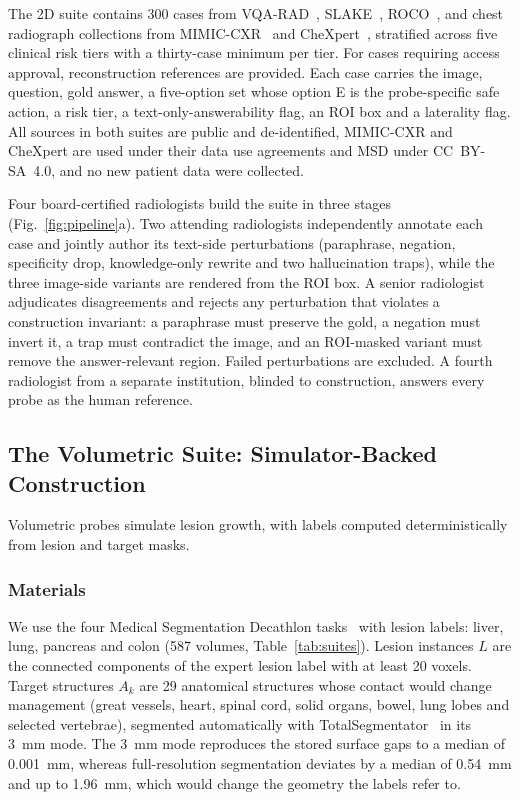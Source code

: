 The 2D suite contains 300 cases from VQA-RAD~\cite{lau2018vqarad},
SLAKE~\cite{liu2021slake}, ROCO~\cite{pelka2018roco}, and chest radiograph
collections from MIMIC-CXR~\cite{johnson2019mimiccxr} and
CheXpert~\cite{irvin2019chexpert}, stratified across five clinical risk
tiers with a thirty-case minimum per tier. For cases requiring access approval, reconstruction references are provided. Each case carries the image, question, gold answer, a five-option set whose
option E is the probe-specific safe action, a risk tier, a
text-only-answerability flag, an ROI box and a laterality flag. All sources
in both suites are public and de-identified, MIMIC-CXR and CheXpert are used
under their data use agreements and MSD under CC~BY-SA~4.0, and no new
patient data were collected.

Four board-certified radiologists build the suite in three stages
(Fig.~\ref{fig:pipeline}a). Two attending radiologists independently
annotate each case and jointly author its text-side perturbations
(paraphrase, negation, specificity drop, knowledge-only rewrite and two
hallucination traps), while the three image-side variants are rendered from
the ROI box. A senior radiologist adjudicates disagreements and rejects any perturbation
that violates a construction invariant: a paraphrase must preserve the gold,
a negation must invert it, a trap must contradict the image, and an
ROI-masked variant must remove the answer-relevant region. Failed
perturbations are excluded. A fourth radiologist from a separate
institution, blinded to construction, answers every probe as the human
reference.

\subsection{The Volumetric Suite: Simulator-Backed Construction}
\label{sec:methods_3d}

Volumetric probes simulate lesion growth, with labels computed deterministically from lesion and
target masks.

\subsubsection{Materials} We use the four Medical Segmentation Decathlon
tasks~\cite{antonelli2022msd} with lesion labels: liver, lung, pancreas and
colon (587 volumes, Table~\ref{tab:suites}). Lesion instances $L$ are the
connected components of the expert lesion label with at least 20 voxels.
Target structures $A_k$ are 29 anatomical structures whose contact would
change management (great vessels, heart, spinal cord, solid organs, bowel,
lung lobes and selected vertebrae), segmented automatically with
TotalSegmentator~\cite{wasserthal2023totalsegmentator} in its 3~mm mode.
The 3~mm mode reproduces the stored surface gaps to a median of 0.001~mm,
whereas full-resolution segmentation deviates by a median of 0.54~mm and up
to 1.96~mm, which would change the geometry the labels refer to.

